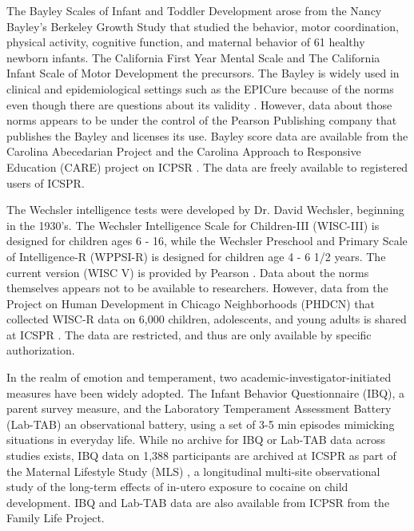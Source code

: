 \documentclass[letterpaper,man,apacite]{apa6}
\begin{document}
The Bayley Scales of Infant and Toddler Development \cite{bayley2006bayley} arose from the Nancy Bayley's Berkeley Growth Study \cite{jones_berkeley_1941} that studied the behavior, motor coordination, physical activity, cognitive function, and maternal behavior of 61 healthy newborn infants.
The California First Year Mental Scale \cite{bayley1933california} and The California Infant Scale of Motor Development \cite{bayley1936california} the precursors.
The Bayley is widely used in clinical and epidemiological settings such as the EPICure \cite{EPICure} because of the norms even though there are questions about its validity \cite{hack_poor_2005}.
However, data about those norms appears to be under the control of the Pearson Publishing company that publishes the Bayley and licenses its use.
Bayley score data are available from the Carolina Abecedarian Project and the Carolina Approach to Responsive Education (CARE) project on ICPSR \cite{CARE}.
The data are freely available to registered users of ICSPR. 

The Wechsler intelligence tests were developed by Dr. David Wechsler, beginning in the 1930's. 
The Wechsler Intelligence Scale for Children-III (WISC-III) is designed for children ages 6 - 16, while the Wechsler Preschool and Primary Scale of Intelligence-R (WPPSI-R) is designed for children age 4 - 6 1/2 years.
The current version (WISC V) is provided by Pearson \cite{WISC_V}.
Data about the norms themselves appears not to be available to researchers.
However, data from the Project on Human Development in Chicago Neighborhoods (PHDCN) that collected WISC-R data on 6,000 children, adolescents, and young adults is shared at ICSPR \cite{PHDCN}. 
The data are restricted, and thus are only available by specific authorization.

In the realm of emotion and temperament, two academic-investigator-initiated measures have been widely adopted.
The Infant Behavior Questionnaire (IBQ), a parent survey measure, and the Laboratory Temperament Assessment Battery (Lab-TAB) \cite{Lab_TAB} an observational battery, using a set of 3-5 min episodes mimicking situations in everyday life.
While no archive for IBQ or Lab-TAB data across studies exists, IBQ data on 1,388 participants are archived at ICSPR as part of the Maternal Lifestyle Study (MLS) \cite{MSL}, a longitudinal multi-site observational study of the long-term effects of in-utero exposure to cocaine on child development.
IBQ and Lab-TAB data are also available from ICPSR from the Family Life Project.
\end{document}
